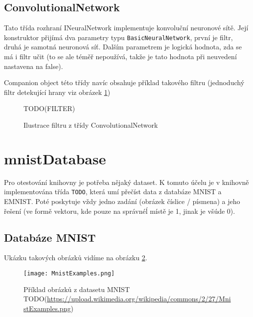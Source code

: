 \documentclass[12pt]{report}			%
\begin{document}
				\subsection{ConvolutionalNetwork}
					Tato třída rozhraní INeuralNetwork implementuje konvoluční neuronové sítě. Její konstruktor přijímá dva parametry typu \verb!BasicNeuralNetwork!, první je filtr, druhá je samotná neuronová síť. Dalším parametrem je logická hodnota, zda se má i filtr učit (to se ale téměř nepoužívá, takže je tato hodnota při neuvedení nastavena na false).
					
					Companion object této třídy navíc obsahuje příklad takového filtru (jednoduchý filtr detekující hrany viz obrázek \ref{fig:filter})
					\begin{figure}
						TODO(FILTER)
						\caption{Ilustrace filtru z třídy ConvolutionalNetwork}
						\label{fig:filter}
					\end{figure}
			
			\section{mnistDatabase}
				Pro otestování knihovny je potřeba nějaký dataset. K tomuto účelu je v knihovně implementována třída \verb!TODO!, která umí přečíst data z databáze MNIST a EMNIST. Poté poskytuje vždy jedno zadání (obrázek číslice / písmena) a jeho řešení (ve formě vektoru, kde pouze na správnéĺ místě je 1, jinak je všúde 0).
				\subsection{Databáze MNIST}
					 \parencite[přeloženo]{online:MNIST} Ukázku takových obrázků vidíme na obrázku \ref{fig:MNIST}.
					
					\begin{figure}
						\texttt{[image: MnistExamples.png]}
						\caption{Příklad obrázků z datasetu MNIST\\TODO(\url{https://upload.wikimedia.org/wikipedia/commons/2/27/MnistExamples.png})}
						\label{fig:MNIST}
					\end{figure}
					
\end{document}
